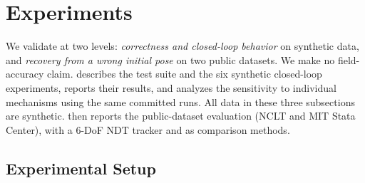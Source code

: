 \section{Experiments}\label{sec:exp}

We validate \sname{} at two levels: \emph{correctness and closed-loop behavior} on synthetic data, and \emph{recovery from a wrong initial pose} on two public datasets. We make no field-accuracy claim.  describes the test suite and the six synthetic closed-loop experiments,  reports their results, and  analyzes the sensitivity to individual mechanisms using the same committed runs. All data in these three subsections are synthetic.  then reports the public-dataset evaluation (NCLT and MIT Stata Center), with a 6-DoF NDT tracker and  as comparison methods.

\subsection{Experimental Setup}\label{sec:setup}

